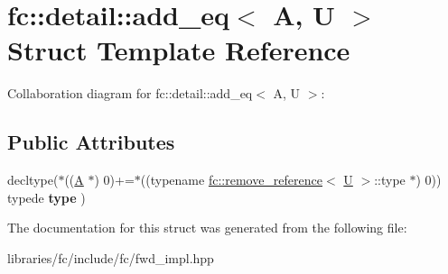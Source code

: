 \hypertarget{structfc_1_1detail_1_1add__eq}{}\section{fc\+:\+:detail\+:\+:add\+\_\+eq$<$ A, U $>$ Struct Template Reference}
\label{structfc_1_1detail_1_1add__eq}


Collaboration diagram for fc\+:\+:detail\+:\+:add\+\_\+eq$<$ A, U $>$\+:
\subsection*{Public Attributes}
\begin{DoxyCompactItemize}
\item 
\mbox{\label{structfc_1_1detail_1_1add__eq_ab9fb800b5e8c1b36c9a2fa199b3c5e24}} 
decltype($\ast$((\mbox{\hyperlink{struct_a}{A}} $\ast$) 0)+=$\ast$((typename \mbox{\hyperlink{structfc_1_1remove__reference}{fc\+::remove\+\_\+reference}}$<$ \mbox{\hyperlink{union_u}{U}} $>$\+::type $\ast$) 0)) typede {\bfseries type} )
\end{DoxyCompactItemize}


The documentation for this struct was generated from the following file\+:\begin{DoxyCompactItemize}
\item 
libraries/fc/include/fc/fwd\+\_\+impl.\+hpp\end{DoxyCompactItemize}
